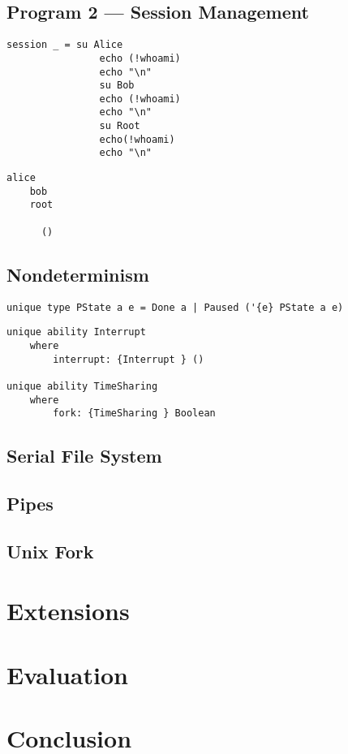 \documentclass[logo,bsc,singlespacing,parskip]{infthesis}
\begin{document}
\begin{tcolorbox}[colback=gray!10, colframe=black, arc=0pt, outer arc=0pt]
  \section*{Program 2 --- Session Management}

  \begin{lstlisting}[language=unison]
    session _ = su Alice
                echo (!whoami)
                echo "\n"
                su Bob
                echo (!whoami)
                echo "\n"
                su Root
                echo(!whoami)
                echo "\n"
  \end{lstlisting}


  \begin{lstlisting}[style=terminal]
    alice
    bob
    root
      
      ()
\end{lstlisting}
\end{tcolorbox}


\section{Nondeterminism}

\begin{lstlisting}[language=unison]
unique type PState a e = Done a | Paused ('{e} PState a e)
\end{lstlisting}


\begin{lstlisting}[language=unison]
unique ability Interrupt
    where
        interrupt: {Interrupt } ()

unique ability TimeSharing
    where
        fork: {TimeSharing } Boolean
\end{lstlisting}

\section{Serial File System}

\section{Pipes}

\section{Unix Fork}

\chapter{Extensions}

\chapter{Evaluation}

\chapter{Conclusion}



\end{document}
